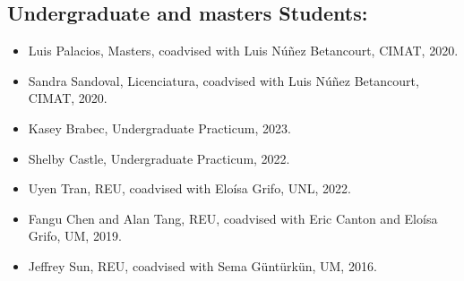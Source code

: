\documentclass[11pt]{amsart}
\begin{document}
	
\subsection*{Undergraduate and masters Students:}
\begin{itemize}[leftmargin=9mm]
	\item Luis Palacios, Masters, coadvised with Luis N\'u\~nez Betancourt, CIMAT, 2020.
	\item Sandra Sandoval, Licenciatura, coadvised with Luis N\'u\~nez Betancourt, CIMAT, 2020.	
	\item Kasey Brabec, Undergraduate Practicum, 2023.
	\item Shelby Castle, Undergraduate Practicum, 2022.

	\item Uyen Tran, REU, coadvised with Elo\'isa Grifo, UNL, 2022.
	\item Fangu Chen and Alan Tang, REU, coadvised with Eric Canton and Elo\'isa Grifo, UM, 2019.
	\item Jeffrey Sun, REU, coadvised with Sema G\"unt\"urk\"un, UM, 2016.
\end{itemize}
\end{document}
